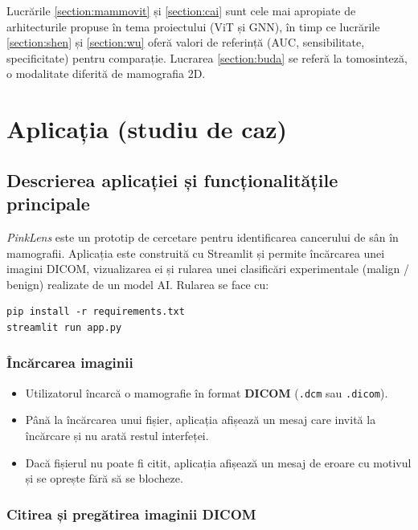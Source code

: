 \documentclass[runningheads,a4paper,11pt]{report}
\begin{document}
Lucrările \ref{section:mammovit} și \ref{section:cai} sunt cele mai apropiate de arhitecturile propuse în tema proiectului (ViT și GNN), în timp ce lucrările \ref{section:shen} și \ref{section:wu} oferă valori de referință (AUC, sensibilitate, specificitate) pentru comparație. Lucrarea \ref{section:buda} se referă la tomosinteză, o modalitate diferită de mamografia 2D.


\chapter{Aplicația (studiu de caz)}
\label{chapter:application}

\section{Descrierea aplicației și funcționalitățile principale}
\label{section:appDescription}

\emph{PinkLens} este un prototip de cercetare pentru identificarea cancerului de sân în mamografii. Aplicația este construită cu Streamlit și permite încărcarea unei imagini DICOM, vizualizarea ei și rularea unei clasificări experimentale (malign / benign) realizate de un model AI. Rularea se face cu:

\begin{verbatim}
pip install -r requirements.txt
streamlit run app.py
\end{verbatim}

\subsection{Încărcarea imaginii}

\begin{itemize}
	\item Utilizatorul încarcă o mamografie în format \textbf{DICOM} (\texttt{.dcm} sau \texttt{.dicom}).
	\item Până la încărcarea unui fișier, aplicația afișează un mesaj care invită la încărcare și nu arată restul interfeței.
	\item Dacă fișierul nu poate fi citit, aplicația afișează un mesaj de eroare cu motivul și se oprește fără să se blocheze.
\end{itemize}

\subsection{Citirea și pregătirea imaginii DICOM}
\end{document}
